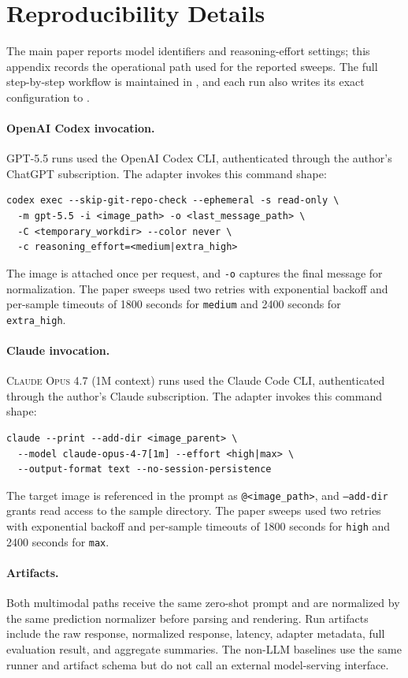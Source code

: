 \section{Reproducibility Details}
\label{app:reproducibility}

The main paper reports model identifiers and reasoning-effort settings; this
appendix records the operational path used for the reported sweeps. The full
step-by-step workflow is maintained in , and each
run also writes its exact configuration to
.

\paragraph{OpenAI Codex invocation.}
\textsc{GPT-5.5} runs used the OpenAI Codex CLI, authenticated through the
author's ChatGPT subscription. The adapter invokes this command shape:
\begin{lstlisting}
codex exec --skip-git-repo-check --ephemeral -s read-only \
  -m gpt-5.5 -i <image_path> -o <last_message_path> \
  -C <temporary_workdir> --color never \
  -c reasoning_effort=<medium|extra_high>
\end{lstlisting}
The image is attached once per request, and \texttt{-o} captures the final
message for normalization. The paper sweeps used two retries with exponential
backoff and per-sample timeouts of 1800 seconds for \texttt{medium} and 2400
seconds for \texttt{extra\_high}.

\paragraph{Claude invocation.}
\textsc{Claude Opus 4.7} (1M context) runs used the Claude Code CLI,
authenticated through the author's Claude subscription. The adapter invokes this
command shape:
\begin{lstlisting}
claude --print --add-dir <image_parent> \
  --model claude-opus-4-7[1m] --effort <high|max> \
  --output-format text --no-session-persistence
\end{lstlisting}
The target image is referenced in the prompt as \texttt{@<image\_path>}, and
\texttt{--add-dir} grants read access to the sample directory. The paper sweeps
used two retries with exponential backoff and per-sample timeouts of 1800
seconds for \texttt{high} and 2400 seconds for \texttt{max}.

\paragraph{Artifacts.}
Both multimodal paths receive the same zero-shot prompt and are normalized by the
same prediction normalizer before parsing and rendering. Run artifacts include
the raw response, normalized response, latency, adapter metadata, full evaluation
result, and aggregate summaries. The non-LLM baselines use the same runner and
artifact schema but do not call an external model-serving interface.

